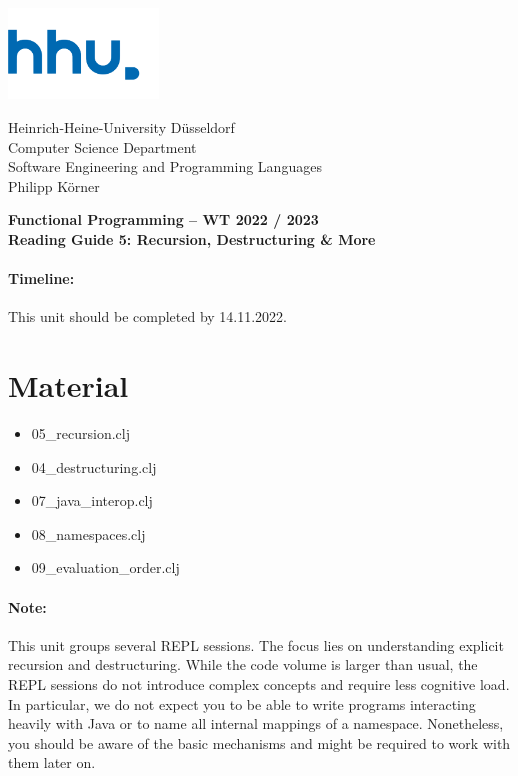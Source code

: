 \documentclass[11pt,a4paper]{article}
\begin{document}
	
	\begin{minipage}[b]{\textwidth}
		\parbox[t]{5cm}{%
			\includegraphics[width=4cm]{unilogo}
			\hfill
		}
		\parbox[b]{11cm}{%
			Heinrich-Heine-University D\"usseldorf\\
			Computer Science Department\\
			Software Engineering and Programming Languages\\
			Philipp K\"orner
		}
	\end{minipage}
\begin{center}
	\bf
	Functional Programming -- WT 2022 / 2023\\
    Reading Guide 5: Recursion, Destructuring \& More
\end{center}

\pagestyle{empty}

\paragraph{Timeline:} This unit should be completed by 14.11.2022.

\section{Material} 

\begin{itemize}
\item 05\_recursion.clj 
\item 04\_destructuring.clj
\item 07\_java\_interop.clj
\item 08\_namespaces.clj
\item 09\_evaluation\_order.clj
\end{itemize}

\paragraph{Note:} This unit groups several REPL sessions.
The focus lies on understanding explicit recursion and destructuring.
While the code volume is larger than usual,
the REPL sessions do not introduce complex concepts
and require less cognitive load.
In particular, we do not expect you to be able to write programs interacting heavily with Java
or to name all internal mappings of a namespace.
Nonetheless, you should be aware of the basic mechanisms
and might be required to work with them later on.
\end{document}
